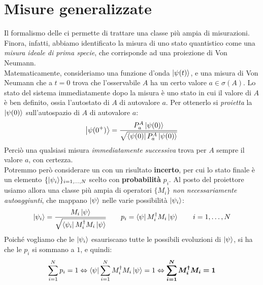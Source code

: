 \documentclass[../../InformazioneQuantistica.tex]{subfiles}
\begin{document}
\section{Misure generalizzate}
Il formalismo delle  ci permette di trattare una classe più ampia di misurazioni.\\
Finora, infatti, abbiamo identificato la misura di uno stato quantistico come una \textit{misura ideale di prima specie}, che corrisponde ad una proiezione di Von Neumann.\\
Matematicamente, consideriamo una funzione d'onda $\Ket{\psi(t)}$, e una misura di Von Neumann che a $t=0$ trova che l'osservabile $A$ ha un certo valore $a\in \sigma(A)$. Lo stato del sistema immediatamente dopo la misura è uno stato in cui il valore di $A$ è ben definito, ossia l'autostato di $A$ di autovalore $a$. Per ottenerlo si \textit{proietta} la $\Ket{\psi(0)}$ sull'autospazio di $A$ di autovalore $a$:
\begin{align*}
\Ket{\psi(0^+)} = \frac{P_a^A \Ket{\psi(0)}}{\sqrt{\Bra{\psi(0)}P_a^A \Ket{\psi(0)}}}
\end{align*}
Perciò una qualsiasi misura \textit{immediatamente successiva} trova per $A$ sempre il valore $a$, con certezza.\\

Potremmo però considerare un  con un risultato \textbf{incerto}, per cui lo stato finale è un elemento $\{\Ket{\psi_i}\}_{i=1,\dots,N}$ scelto con \textbf{probabilità} $p_i$. Al posto del proiettore usiamo allora una classe più ampia di operatori $\{M_i\}$ \textit{non necessariamente autoaggiunti}, che mappano $\Ket{\psi}$ nelle varie possibilità $\Ket{\psi_i}$: 
\begin{align*}
\Ket{\psi_i} = \frac{M_i \Ket{\psi}}{\sqrt{\Bra{\psi_i}M_i^\dag M_i\Ket{\psi}}} \qquad p_i = \Bra{\psi}M_i^\dag M_i \Ket{\psi} \qquad i=1,\dots,N
\end{align*}
Poiché vogliamo che le $\Ket{\psi_i}$ esauriscano tutte le possibili evoluzioni di $\Ket{\psi}$, si ha che le $p_i$ si sommano a $1$, e quindi: 
\begin{align}
\sum_{i=1}^N p_i = 1 \Leftrightarrow \Bra{\psi} \sum_{i=1}^N M_i^\dag M_i\Ket{\psi} = 1 \Leftrightarrow \bm{\sum_{i=1}^N M_i^\dag M_i = 1}
\label{eqn:condizione-misure}
\end{align}
\end{document}
